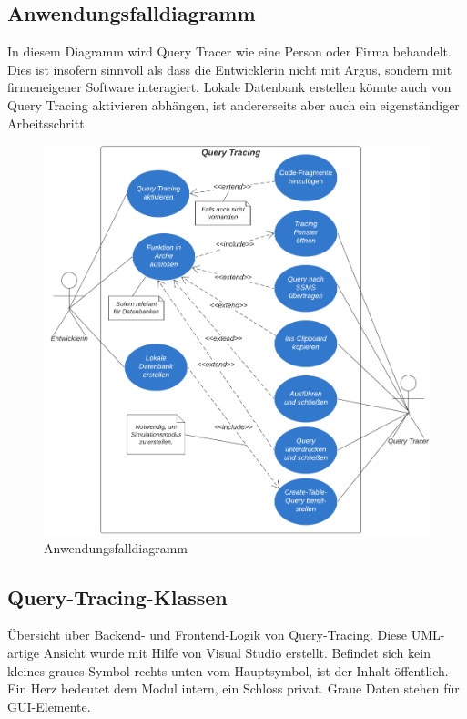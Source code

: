 \documentclass[11pt,toc=sectionentrywithoutdots, 
headheight=44pt, headings=optiontoheadandtoc, hyperfootnotes=false, hypertexnames=false]{scrartcl}
\begin{document}
\subsection{Anwendungsfalldiagramm}
In diesem Diagramm wird \glqq Query Tracer\grqq{} wie eine Person oder Firma behandelt. Dies ist insofern sinnvoll als dass die Entwicklerin nicht mit Argus, sondern mit firmeneigener Software interagiert. \glqq Lokale Datenbank erstellen\grqq{} könnte auch von \glqq Query Tracing aktivieren\grqq{} abhängen, ist andererseits aber auch ein eigenständiger Arbeitsschritt.
 \label{fig:Anwendungsfalldiagramm}

 \begin{figure}[htp]

	\includegraphics[scale=1.1]{Anwendungsfalldiagramm_2.png}
	 \caption{Anwendungsfalldiagramm}
 \end{figure}
 \clearpage
 
 \subsection{Query-Tracing-Klassen}
Übersicht über Backend- und Frontend-Logik von Query-Tracing. Diese \acs{UML}-artige Ansicht wurde mit Hilfe von Visual Studio erstellt. Befindet sich kein kleines graues Symbol rechts unten vom Hauptsymbol, ist der Inhalt \glqq öffentlich\grqq{}. Ein Herz bedeutet dem Modul \glqq intern\grqq{}, ein Schloss \glqq privat\grqq{}. Graue Daten stehen für GUI-Elemente.
 \label{fig:Query-Tracing-Klassen}
\end{document}
